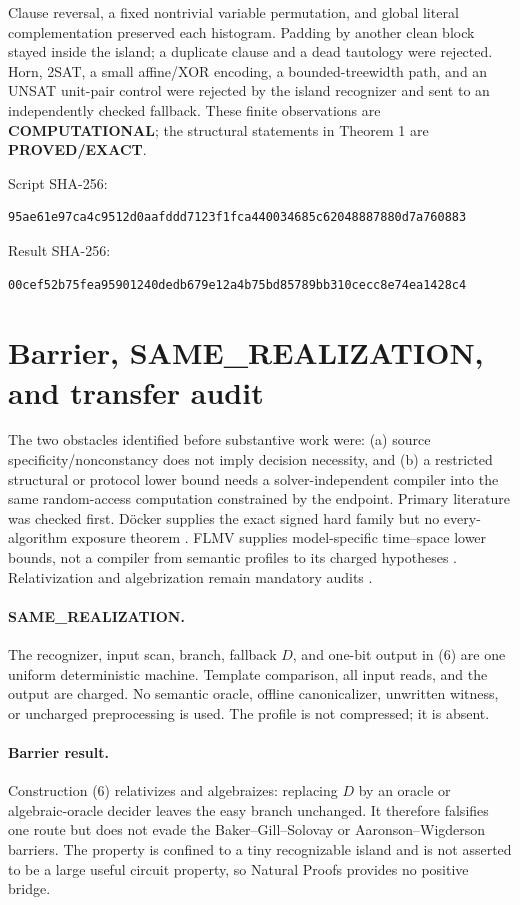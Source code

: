 \documentclass[11pt]{article}
\newcommand{\EXACT}{\textbf{PROVED/EXACT}}
\newcommand{\COMP}{\textbf{COMPUTATIONAL}}
\begin{document}
Clause reversal, a fixed nontrivial variable permutation, and global literal
complementation preserved each histogram.  Padding by another clean block
stayed inside the island; a duplicate clause and a dead tautology were
rejected.  Horn, 2SAT, a small affine/XOR encoding, a bounded-treewidth path,
and an UNSAT unit-pair control were rejected by the island recognizer and sent
to an independently checked fallback.  These finite observations are \COMP;
the structural statements in Theorem 1 are \EXACT.

Script SHA-256:
\begin{verbatim}
95ae61e97ca4c9512d0aafddd7123f1fca440034685c62048887880d7a760883
\end{verbatim}
Result SHA-256:
\begin{verbatim}
00cef52b75fea95901240dedb679e12a4b75bd85789bb310cecc8e74ea1428c4
\end{verbatim}

\section{Barrier, SAME\_REALIZATION, and transfer audit}

The two obstacles identified before substantive work were: (a) source
specificity/nonconstancy does not imply decision necessity, and (b) a
restricted structural or protocol lower bound needs a solver-independent
compiler into the same random-access computation constrained by the endpoint.
Primary literature was checked first.  D\"ocker supplies the exact signed
hard family but no every-algorithm exposure theorem \cite{Docker19}.  FLMV
supplies model-specific time--space lower bounds, not a compiler from semantic
profiles to its charged hypotheses \cite{FLMV05}.  Relativization and
algebrization remain mandatory audits \cite{BGS75,AW09}.

\paragraph{SAME\_REALIZATION.}
The recognizer, input scan, branch, fallback $D$, and one-bit output in (6)
are one uniform deterministic machine.  Template comparison, all input reads,
and the output are charged.  No semantic oracle, offline canonicalizer,
unwritten witness, or uncharged preprocessing is used.  The profile is not
compressed; it is absent.

\paragraph{Barrier result.}
Construction (6) relativizes and algebraizes: replacing $D$ by an oracle or
algebraic-oracle decider leaves the easy branch unchanged.  It therefore
falsifies one route but does not evade the Baker--Gill--Solovay or
Aaronson--Wigderson barriers.  The property is confined to a tiny recognizable
island and is not asserted to be a large useful circuit property, so Natural
Proofs provides no positive bridge.
\end{document}
